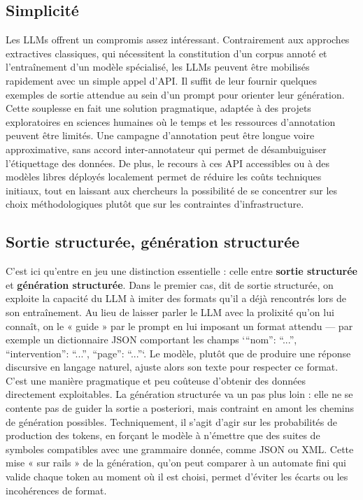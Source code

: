 \subsection{Simplicité}

Les LLMs offrent un compromis assez intéressant. Contrairement aux approches extractives classiques, qui nécessitent la constitution d’un corpus annoté et l’entraînement d’un modèle spécialisé, les LLMs peuvent être mobilisés rapidement avec un simple appel d'API. Il suffit de leur fournir quelques exemples de sortie attendue au sein d’un prompt pour orienter leur génération. Cette souplesse en fait une solution pragmatique, adaptée à des projets exploratoires en sciences humaines où le temps et les ressources d’annotation peuvent être limités. Une campagne d'annotation peut être longue voire approximative, sans accord inter-annotateur qui permet de désambuiguiser l'étiquettage des données. De plus, le recours à ces API accessibles ou à des modèles libres déployés localement permet de réduire les coûts techniques initiaux, tout en laissant aux chercheurs la possibilité de se concentrer sur les choix méthodologiques plutôt que sur les contraintes d’infrastructure. 

\subsection{Sortie structurée, génération structurée}

C’est ici qu’entre en jeu une distinction essentielle : celle entre \textbf{sortie structurée} et \textbf{génération structurée}. Dans le premier cas, dit de sortie structurée, on exploite la capacité du LLM à imiter des formats qu’il a déjà rencontrés lors de son entraînement. Au lieu de laisser parler le LLM avec la prolixité qu'on lui connaît, on le « guide » par le prompt en lui imposant un format attendu — par exemple un dictionnaire JSON comportant les champs `{\enquote{nom}: \enquote{...}, \enquote{intervention}: \enquote{...}, \enquote{page}: \enquote{...}}`. Le modèle, plutôt que de produire une réponse discursive en langage naturel, ajuste alors son texte pour respecter ce format. C’est une manière pragmatique et peu coûteuse d’obtenir des données directement exploitables. La génération structurée va un pas plus loin : elle ne se contente pas de guider la sortie a posteriori, mais contraint en amont les chemins de génération possibles. Techniquement, il s’agit d’agir sur les probabilités de production des tokens, en forçant le modèle à n’émettre que des suites de symboles compatibles avec une grammaire donnée, comme JSON ou XML. Cette mise « sur rails » de la génération, qu’on peut comparer à un automate fini qui valide chaque token au moment où il est choisi, permet d’éviter les écarts ou les incohérences de format. 

